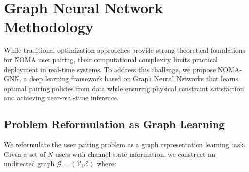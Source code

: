 \section{Graph Neural Network Methodology}

While traditional optimization approaches provide strong theoretical foundations for NOMA user pairing, their computational complexity limits practical deployment in real-time systems. To address this challenge, we propose NOMA-GNN, a deep learning framework based on Graph Neural Networks that learns optimal pairing policies from data while ensuring physical constraint satisfaction and achieving near-real-time inference.

\subsection{Problem Reformulation as Graph Learning}

We reformulate the user pairing problem as a graph representation learning task. Given a set of $N$ users with channel state information, we construct an undirected graph $\mathcal{G} = (\mathcal{V}, \mathcal{E})$ where:

